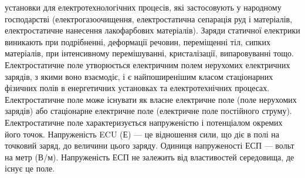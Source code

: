 \documentclass[14pt]{extarticle} %
\begin{document}
установки для електротехнологічних процесів, які застосовують у народному
господарстві (електрогазоочищення, електростатична сепарація руд і матеріалів,
електростатичне нанесення лакофарбових матеріалів). Заряди статичної електрики
виникають при подрібненні, деформації речовин, переміщенні тіл, сипких
матеріалів, при інтенсивному перемішуванні, кристалізації, випаровуванні тощо.
Електростатичне поле утворюється електричним полем нерухомих електричних
зарядів, з якими воно взаємодіє, і є найпоширенішим класом стаціонарних
фізичних полів в енергетичних установках та електротехнічних процесах.
Електростатичне поле може існувати як власне електричне поле (поле нерухомих
зарядів) або стаціонарне електричне поле (електричне поле постійного струму).
Електростатичне поле характеризується напруженістю і потенціалом окремих його
точок. Напруженість ECU (Е) — це відношення сили, що діє в полі на точковий
заряд, до величини цього заряду. Одиниця напруженості ЕСП — вольт на метр
(В/м). Напруженість ЕСП не залежить від властивостей середовища, де існує це
поле.
\end{document}
